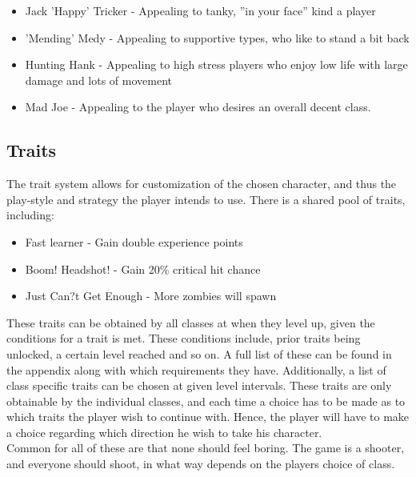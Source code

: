 \begin{itemize}
\item Jack 'Happy' Tricker - Appealing to tanky, ''in your face'' kind a player
\item 'Mending' Medy - Appealing to supportive types, who like to stand a bit back
\item Hunting Hank - Appealing to high stress players who enjoy low life with large damage and lots of movement
\item Mad Joe - Appealing to the player who desires an overall decent class. 
\end{itemize}

\subsection*{Traits}\label{gamedesign:ourgame:traits}
The trait system allows for customization of the chosen character, and thus the play-style and strategy the player intends to use.
There is a shared pool of traits, including:
\begin{itemize}
\item Fast learner - Gain double experience points
\item Boom! Headshot!  - Gain 20\% critical hit chance
\item Just Can?t Get Enough - More zombies will spawn
\end{itemize} 
These traits can be obtained by all classes at when they level up, given the conditions for a trait is met. These conditions include, prior traits being unlocked, a certain level reached and so on.
A full list of these can be found in the appendix  along with which requirements they have.
Additionally, a list of class specific traits can be chosen at given level intervals. 
These traits are only obtainable by the individual classes, and each time a choice has to be made as to which traits the player wish to continue with. Hence, the player will have to make a choice regarding which direction he wish to take his character.\\

Common for all of these are that none should feel boring. 
The game is a shooter, and everyone should shoot, in what way depends on the players choice of class.\\

